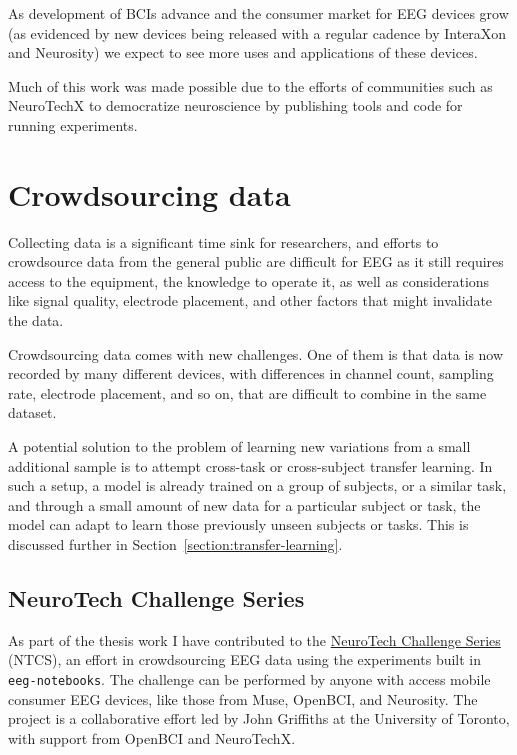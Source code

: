     As development of BCIs advance and the consumer market for EEG devices grow (as evidenced by new devices being released with a regular cadence by InteraXon and Neurosity) we expect to see more uses and applications of these devices.

    Much of this work was made possible due to the efforts of communities such as NeuroTechX to democratize neuroscience by publishing tools and code for running experiments.

\section{Crowdsourcing data}

    Collecting data is a significant time sink for researchers, and efforts to crowdsource data from the general public are difficult for EEG as it still requires access to the equipment, the knowledge to operate it, as well as considerations like signal quality, electrode placement, and other factors that might invalidate the data.

    Crowdsourcing data comes with new challenges. One of them is that data is now recorded by many different devices, with differences in channel count, sampling rate, electrode placement, and so on, that are difficult to combine in the same dataset. 

    A potential solution to the problem of learning new variations from a small additional sample is to attempt cross-task or cross-subject transfer learning. In such a setup, a model is already trained on a group of subjects, or a similar task, and through a small amount of new data for a particular subject or task, the model can adapt to learn those previously unseen subjects or tasks. This is discussed further in Section~\ref{section:transfer-learning}.

    \subsection{NeuroTech Challenge Series}\label{section:ntcs}

    As part of the thesis work I have contributed to the \href{https://neurotech-challenge.com/}{NeuroTech Challenge Series} (NTCS), an effort in crowdsourcing EEG data using the experiments built in \texttt{eeg-notebooks}. The challenge can be performed by anyone with access mobile consumer EEG devices, like those from Muse, OpenBCI, and Neurosity\@. The project is a collaborative effort led by John Griffiths at the University of Toronto, with support from OpenBCI and NeuroTechX.


